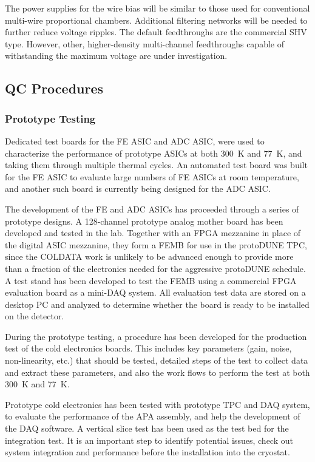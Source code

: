 The power supplies for the wire bias will be similar to 
those used for conventional multi-wire proportional chambers. 
Additional filtering networks will 
be needed to further reduce voltage ripples.  
The default feedthroughs are the commercial SHV type.  
However,  other, higher-density multi-channel 
feedthroughs capable of withstanding the maximum voltage are under investigation.  


\subsection{QC Procedures}

\subsubsection{Prototype Testing}
\label{subsubsec:ce_install_proto}

Dedicated test boards for the FE ASIC and ADC ASIC,
were used to characterize the performance of prototype ASICs at both 300~K and 77~K,
and taking them through multiple thermal cycles.
An automated test board was built for the FE ASIC to evaluate large numbers of FE ASICs at room temperature,
and another such board is currently being designed for the ADC ASIC.


The development of the FE and ADC ASICs has proceeded through a series of prototype designs.
A 128-channel prototype analog mother board has been developed and tested in the lab.
Together with an FPGA mezzanine in place of the digital ASIC mezzanine,
they form a FEMB for use in the protoDUNE TPC,
since the COLDATA work is unlikely to be advanced enough to
provide more than a fraction of the electronics needed for the aggressive protoDUNE schedule.
A test stand has been developed to test the FEMB
using a commercial FPGA evaluation board as a mini-DAQ system.
All evaluation test data are stored on a desktop PC and analyzed to
determine whether the board is ready to be installed on the detector.

During the prototype testing, a procedure has been developed for the production test of the cold electronics boards.
This includes key parameters (gain, noise, non-linearity, etc.) that should be tested,
detailed steps of the test to collect data and extract these parameters,
and also the work flows to perform the test at both 300~K and 77~K.

Prototype cold electronics has been tested with prototype TPC and DAQ system,
to evaluate the performance of the APA assembly, and help the development of the DAQ software.
A vertical slice test has been used as the test bed for the integration test.
It is an important step to identify potential issues, check out system integration and performance
before the installation into the cryostat.

